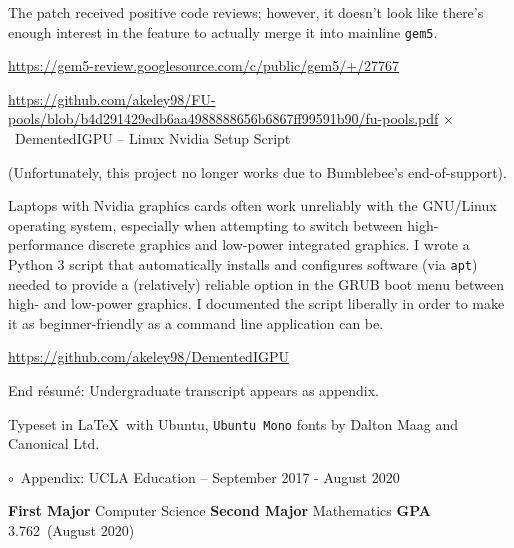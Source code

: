 \documentclass[11pt]{article}
\newcommand{\web}[1]{{ \color{webColor} \small \url{#1}}}
\newcommand{\myTitle}[1]{{ \vspace{2mm} \LARGE \color{titleColor} \hspace{-12mm} \( \circ \)\ \textsf{#1} \vspace{2mm}}}
\newcommand{\mySub}[1]{{\color{subColor}\hspace{-6mm} \( \times \)\ \textsf{#1}}}
\newcommand{\myKey}[1]{{\color{keyColor}\textbf{#1}}}
\newcommand{\GPA}{3.762}
\newcommand{\GpaDate}{August 2020}
\begin{document}
The patch received positive code reviews; however, it doesn't look
like there's enough interest in the feature to actually merge it into
mainline \texttt{gem5}.

\web{https://gem5-review.googlesource.com/c/public/gem5/+/27767}

\web{https://github.com/akeley98/FU-pools/blob/b4d291429edb6aa4988888656b6867ff99591b90/fu-pools.pdf}
\filbreak
\mySub{DementedIGPU -- Linux Nvidia Setup Script}

(Unfortunately, this project no longer works due to Bumblebee's
end-of-support).

Laptops with Nvidia graphics cards often work unreliably with the
GNU/Linux operating system, especially when attempting to switch
between high-performance discrete graphics and low-power integrated
graphics. I wrote a Python 3 script that automatically installs and
configures software (via \texttt{apt}) needed to provide a
(relatively) reliable option in the GRUB boot menu between high- and
low-power graphics. I documented the script liberally in order to make
it as beginner-friendly as a command line application can be.

\web{https://github.com/akeley98/DementedIGPU}

\vspace{5cm}

{
\begin{center}
End résumé: Undergraduate transcript appears as appendix.

\color{gray}
Typeset in \LaTeX\ with \textsf{Ubuntu}, \texttt{Ubuntu Mono} fonts by
Dalton Maag and Canonical Ltd.
\end{center}
}

\newpage
\myTitle{Appendix: UCLA Education -- September 2017 - August 2020}

\myKey{First Major} Computer Science \hfill\myKey{Second Major}
Mathematics \hfill\myKey{GPA} \GPA\ (\GpaDate)
\end{document}
